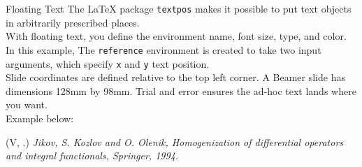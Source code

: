 \documentclass[10pt, xcolor=dvipsnames]{beamer}
\newenvironment{reference}[2]{                                    %
  \begin{textblock*}{\textwidth}(#1, #2)
      \tiny\it\bgroup\color{red!70!QPblue}}{\egroup\end{textblock*}}
\begin{document}
\begin{frame}{Floating Text}
The \LaTeX{} package \texttt{textpos} makes it possible to put text objects in arbitrarily prescribed places.\\[2ex]

With floating text, you define the environment name, font size, type, and color.\\[2ex]

In this example, The \texttt{reference} environment is created to take two input arguments, which specify \texttt{x} and \texttt{y} text position.\\[2ex]

Slide coordinates are defined relative to the top left corner.  A Beamer slide has dimensions 128mm by 98mm.  Trial and error ensures the ad-hoc text lands where you want.\\[2ex]

Example below:

\begin{reference}{4mm}{75mm}
      V. Jikov, S. Kozlov and O. Olenik, Homogenization of differential operators and integral functionals, Springer, 1994.
\end{reference}
\end{frame}

\end{document}
